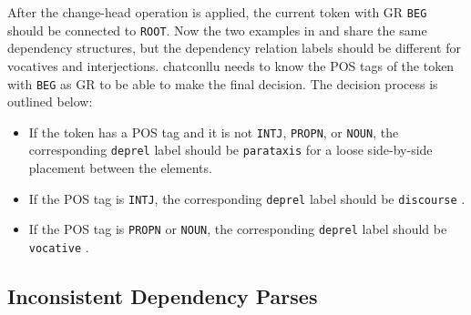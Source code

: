 After the change-head operation is applied, the current token with GR \texttt{BEG} should be connected to \texttt{ROOT}. Now the two examples in  and  share the same dependency structures, but the dependency relation labels should be different for vocatives and interjections. chatconllu needs to know the POS tags of the token with \texttt{BEG} as GR to be able to make the final decision. The decision process is outlined below:\\

\begin{itemize}
	\item If the token has a POS tag and it is not \texttt{INTJ}, \texttt{PROPN}, or \texttt{NOUN}, the corresponding \texttt{deprel}  label should be \texttt{parataxis} for a loose side-by-side placement between the elements.
	\item If the POS tag is \texttt{INTJ}, the corresponding \texttt{deprel} label should be \texttt{discourse} .
	\item If the POS tag is \texttt{PROPN} or \texttt{NOUN}, the corresponding \texttt{deprel} label should be \texttt{vocative} .
\end{itemize}

\subsection{Inconsistent Dependency Parses}

